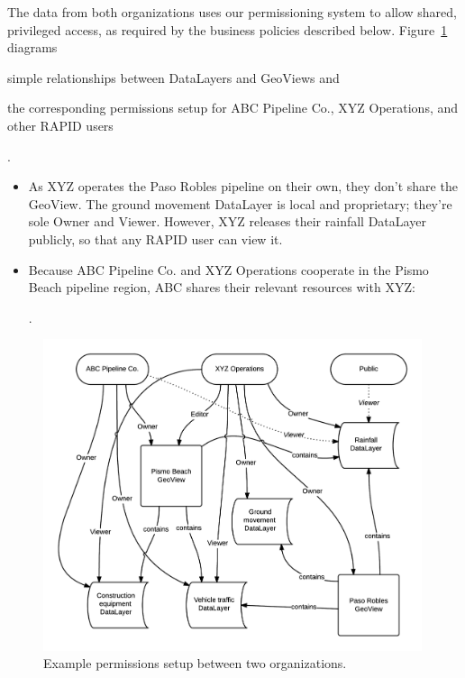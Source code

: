 The data from both organizations uses our permissioning system to allow shared, privileged access, as required by the business policies described below. Figure~\ref{fig:permissions} diagrams  
\begin{enumerate*}[label=\itshape\alph*\upshape)]
\item simple relationships between DataLayers and GeoViews and
\item the corresponding permissions setup for ABC Pipeline Co., XYZ Operations, and other RAPID users
\end{enumerate*}.

\begin{itemize}
\item As XYZ operates the Paso Robles pipeline on their own, they don't share the GeoView. The ground movement DataLayer is local and proprietary; they're sole Owner and Viewer. However, XYZ releases their rainfall DataLayer publicly, so that any RAPID user can view it.
\item Because ABC Pipeline Co. and XYZ Operations cooperate in the Pismo Beach pipeline region, ABC shares their relevant resources with XYZ: .
\end{itemize}
 

\begin{figure}[h]
    \centering
    \includegraphics[width=0.99\textwidth]{figures/permissions.png}
    \caption{Example permissions setup between two organizations.}
    \label{fig:permissions}
\end{figure}

